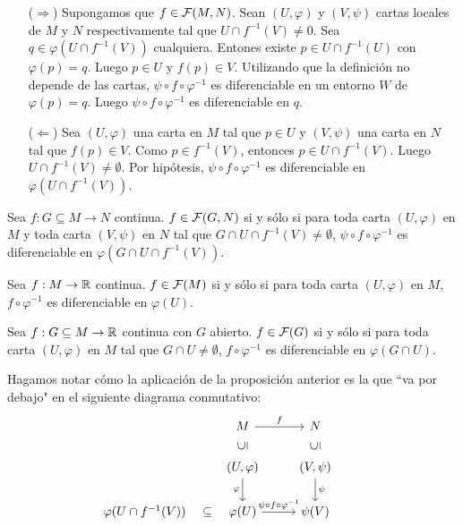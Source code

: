 \documentclass[cursovd_portada.tex]{subfiles}
\begin{document}
\begin{dem}\mbox{}
\begin{itemize}
	\item[($\Rightarrow$)] Supongamos que $f \in {\cal F}(M,N)$. Sean $(U,φ)$ y $(V,ψ)$ cartas locales de $M$ y $N$ respectivamente tal que $U \cap f^{-1}(V) \neq 0$. Sea $q \in φ(U \cap f^{-1}(V))$ cualquiera. Entones existe $p \in U \cap f^{-1}(U)$ con $φ(p)=q$. Luego $p \in U$ y $f(p) \in V$. Utilizando que la definición no depende de las cartas, $ψ \circ f \circ φ^{-1}$ es diferenciable en un entorno $W$ de $φ(p)=q$. Luego $ψ \circ f \circ φ^{-1}$ es diferenciable en $q$.
	\item[($\Leftarrow$)] Sea $(U,φ)$ una carta en $M$ tal que $p \in U$ y $(V,ψ)$ una carta en $N$ tal que $f(p) \in V$. Como $p \in f^{-1}(V)$, entonces $p \in U \cap f^{-1}(V)$. Luego $U \cap f^{-1}(V) \neq \emptyset$. Por hipótesis, $ψ \circ f \circ φ^{-1}$ es diferenciable en $φ(U \cap f^{-1}(V))$.
\end{itemize}
\begin{coro} Sea $f : G \subseteq M \to N$ continua. $f \in {\cal F}(G,N)$ si y sólo si para toda carta $(U,φ)$ en $M$ y toda carta $(V,ψ)$ en $N$ tal que  $G \cap U \cap f^{-1}(V) \neq \emptyset$, $ψ \circ f \circ φ^{-1}$ es diferenciable en $φ(G \cap U \cap f^{-1}(V))$.
\end{coro}
\begin{coro} Sea $f : M \to \mathbb{R}$ continua. $f \in {\cal F}(M)$ si y sólo si para toda carta $(U,φ)$ en $M$, $f \circ φ^{-1}$ es diferenciable en $φ(U)$.
\end{coro}
\begin{coro} Sea $f : G \subseteq M \to \mathbb{R}$ continua con $G$ abierto. $f \in {\cal F}(G)$ si y sólo si para toda carta $(U,φ)$ en $M$ tal que $G \cap U \neq \emptyset$, $f \circ φ^{-1}$ es diferenciable en $φ(G \cap U)$.
\end{coro}
\end{dem}
Hagamos notar c\'omo la aplicaci\'on de la proposici\'on anterior es la que ``va por debajo" en el siguiente diagrama conmutativo:
\[
\begin{tikzcd}
& M  \arrow[r, "f"] & N & \\
& (U,\varphi)\arrow[u,phantom, "\rotatebox{90}{$\subseteq$}"]\arrow[d,"\varphi"']  & (V,\psi)\arrow[d,"\psi"]\arrow[u,phantom, "\rotatebox{90}{$\subseteq$}"] &  \\
\varphi(U\cap f^{-1}(V))\arrow[r,phantom, "{\subseteq}"] & \varphi(U) \arrow[r,"\psi\circ f\circ\varphi^{-1}"] & \psi(V)& 
\end{tikzcd}
\]
\end{document}
